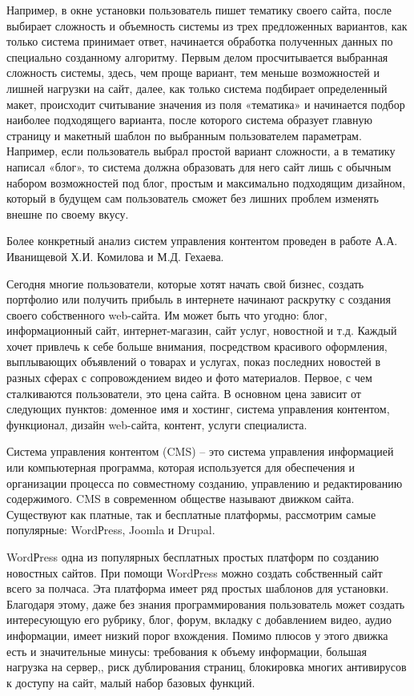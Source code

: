 Например, в окне установки пользователь пишет тематику своего сайта, после выбирает сложность и объемность системы из трех предложенных вариантов, как только система принимает ответ, начинается обработка полученных данных по специально созданному алгоритму.
Первым делом просчитывается выбранная сложность системы, здесь, чем проще вариант, тем меньше возможностей и лишней нагрузки на сайт, далее, как только система подбирает определенный макет, происходит считывание значения из поля «тематика» и начинается подбор наиболее подходящего варианта, после которого система образует главную страницу и макетный шаблон по выбранным пользователем параметрам.
Например, если пользователь выбрал простой вариант сложности, а в тематику написал «блог», то система должна образовать для него сайт лишь с обычным набором возможностей под блог, простым и максимально подходящим дизайном, который в будущем сам пользователь сможет без лишних проблем изменять внешне по своему вкусу. 

Более конкретный анализ систем управления контентом проведен в работе \cite{ivanisheva-cms} А.А. Иванищевой Х.И. Комилова и М.Д. Гехаева.

Сегодня многие пользователи, которые хотят начать свой бизнес, создать портфолио или получить прибыль в интернете начинают раскрутку с создания своего собственного web-сайта.
Им может быть что угодно: блог, информационный сайт, интернет-магазин, сайт услуг, новостной и т.д.
Каждый хочет привлечь к себе больше внимания, посредством красивого оформления, выплывающих объявлений о товарах и услугах, показ последних новостей в разных сферах с сопровождением видео и фото материалов.
Первое, с чем сталкиваются пользователи, это цена сайта.
В основном цена зависит от следующих пунктов: доменное имя и хостинг, система управления контентом, функционал, дизайн web-сайта, контент, услуги специалиста.

Система управления контентом (CMS) – это система управления информацией или компьютерная программа, которая используется для обеспечения и организации процесса по совместному созданию, управлению и редактированию содержимого.
CMS в современном обществе называют движком сайта.
Существуют как платные, так и бесплатные платформы, рассмотрим самые популярные: WordРress, Joomla
и Drupal.

WordРress одна из популярных бесплатных простых платформ по созданию новостных сайтов. При
помощи WordРress можно создать собственный сайт всего за полчаса. Эта платформа имеет ряд простых
шаблонов для установки. Благодаря этому, даже без знания программирования пользователь может создать
интересующую его рубрику, блог, форум, вкладку с добавлением видео, аудио информации, имеет низкий
порог вхождения.
Помимо плюсов у этого движка есть и значительные минусы: требования к объему информации, большая нагрузка на сервер,, риск дублирования страниц, блокировка многих антивирусов к доступу на сайт, малый набор базовых функций.

